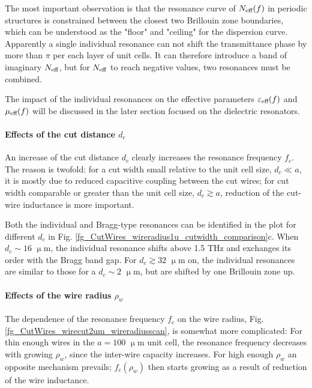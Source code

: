The most important observation is that the resonance curve of $N_{\text{eff} }(f)$ in periodic structures is constrained between the closest two Brillouin zone boundaries, which can be understood as the "floor" and "ceiling" for the dispersion curve. Apparently a single individual resonance can not shift the transmittance phase by more than $\pi$ per each layer of unit cells. It can therefore introduce a band of imaginary $N_{\text{eff} }$, but for $N_{\text{eff} }$ to reach negative values, two resonances must be combined.

The impact of the individual resonances on the effective parameters $\varepsilon_{\text{eff} }(f)$ and $\mu_{\text{eff} }(f)$ will be discussed in the later section focused on the dielectric resonators. %

\paragraph{Effects of the cut distance $d_c$}%
An increase of the cut distance $d_c$ clearly increases the resonance frequency $f_c$. The reason is twofold: for a cut width small relative to the unit cell size, $d_c\ll a$, it is mostly due to reduced capacitive coupling between the cut wires; for cut width comparable or greater than the unit cell size, $d_c \gtrsim a$, reduction of the cut-wire inductance is more important.

Both the individual and Bragg-type resonances can be identified in the plot for different $d_c$ in Fig. \ref{fg_CutWires_wireradius1u_cutwidth_comparison}c. When $d_c \sim 16$  $\upmu$m, the individual resonance shifts above 1.5 THz and exchanges its order with the Bragg band gap. 
For $d_c \gtrsim 32$  $\upmu$m on, the individual resonances are similar to those for a $d_c\sim 2$ $\upmu$m, but are shifted by one Brillouin zone up.

\paragraph{Effects of the wire radius $\rho_w$}%
The dependence of the resonance frequency $f_c$ on the wire radius, Fig. \ref{fg_CutWires_wirecut2um_wireradiusscan}, is somewhat more complicated: For thin enough wires in the $a=100$ $\upmu$m unit cell, the resonance frequency decreases with growing $\rho_w$, since the inter-wire capacity increases. 
For high enough $\rho_w$ an opposite mechanism prevails; $f_c(\rho_w)$ then starts growing as a result of reduction of the wire inductance.

